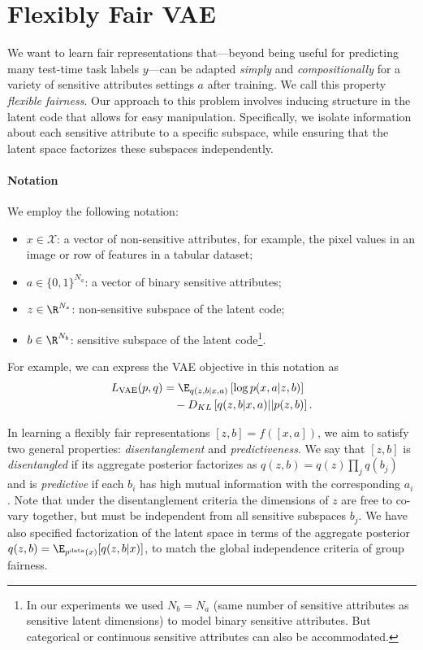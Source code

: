 \section{Flexibly Fair VAE} \label{sec:method}

We want to learn fair representations that---beyond being useful for predicting many test-time task labels $y$---can be adapted \textit{simply} and \textit{compositionally} for a variety of sensitive attributes settings $a$ after training.
We call this property \textit{flexible fairness}.
Our approach to this problem involves inducing structure in the latent code that allows for easy manipulation.
Specifically, we isolate information about each sensitive attribute to a specific subspace, while ensuring that the latent space factorizes these subspaces independently. 

\paragraph{Notation}
We employ the following notation:
\begin{itemize}
    \item $x \in \mathcal{X}$: a vector of non-sensitive attributes, for example, the pixel values in an image or row of features in a tabular dataset;
    \item $a \in \{0,1\}^{N_a}$: a vector of binary sensitive attributes;
    \item $z \in \R^{N_z}$: non-sensitive subspace of the latent code;
    \item $b \in \R^{N_b}$: sensitive subspace of the latent code\footnote{
    In our experiments we used $N_b = N_a$ (same number of sensitive attributes as sensitive latent dimensions) to model binary sensitive attributes. 
    But categorical or continuous sensitive attributes can also be accommodated. 
    }.
\end{itemize}
For example, we can express the VAE objective in this notation as
\begin{align}%
    L_{\text{VAE}}(p,q) &= \E_{q(z,b|x,a)} \left[ \log p(x,a|z,b) \right] \nonumber \\
    &\quad - D_{KL} \left[ q(z,b|x,a) || p(z,b)  \right]. \nonumber
\end{align}

In learning a flexibly fair representations $[z,b]=f([x,a])$, we aim to satisfy two general properties: \emph{disentanglement} and \emph{predictiveness}.
We say that $[z,b]$ is \emph{disentangled} if its aggregate posterior factorizes as $q(z,b)=q(z)\prod_j q(b_j)$ and is \emph{predictive} if each $b_i$ has high mutual information with the corresponding $a_i$.
Note that under the disentanglement criteria the dimensions of $z$ are free to co-vary together, but must be independent from all sensitive subspaces ${b_j}$.
We have also specified factorization of the latent space in terms of the aggregate posterior $q(z,b)=\E_{p^{\text{data}}(x)} [q(z,b|x)]$, to match the global independence criteria of group fairness.

